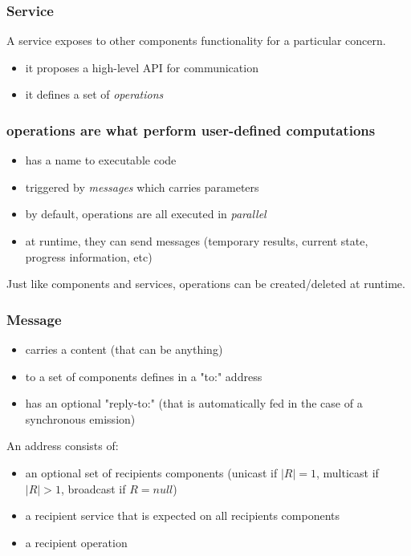 \documentclass[11pt]{beamer}
\begin{document}
\begin{frame}
\frametitle{Service}
A service exposes to other components functionality for a particular concern. 
\begin{itemize}
	\item it proposes a high-level API for communication
	\item it defines a set of \emph{operations}
\end{itemize}
\end{frame}



\begin{frame}
\frametitle{operations are what perform user-defined computations}
\begin{itemize}
	\item has a name to executable code
	\item triggered by \emph{messages} which carries parameters
	\item by default, operations are all executed in \emph{parallel}
	\item at runtime, they can send messages (temporary results, current state, progress information, etc) 
\end{itemize}
Just like components and services, operations can be created/deleted at runtime.
\end{frame}




\begin{frame}
\frametitle{Message}
\begin{itemize}
	\item carries a content (that can be anything)
	\item to a set of components defines in a "to:"  address
	\item has an optional "reply-to:" (that is automatically fed in the case of a synchronous emission)
\end{itemize}
An address consists of:
\begin{itemize}
	\item an optional set of recipients components (unicast if $|R|=1$, multicast if $|R|>1$, broadcast if $R=null$)
	\item a recipient service that is expected on all recipients components
	\item a recipient operation
\end{itemize}
\end{frame}
\end{document}
